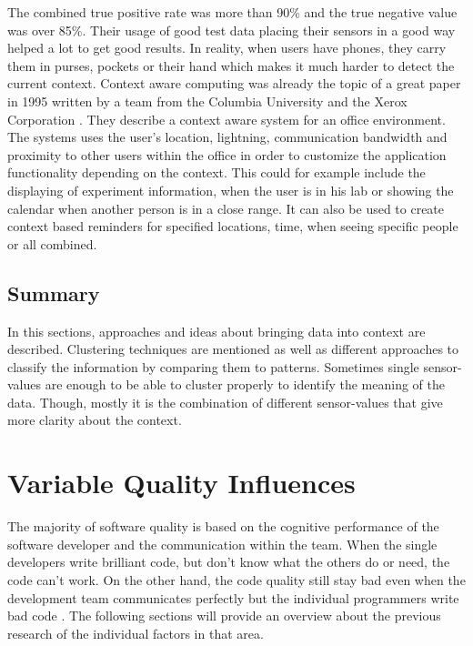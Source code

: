 The combined true positive rate was more than 90\% and the true negative value was over 85\%. Their usage of good test data placing their sensors in a good way helped a lot to get good results. In reality, when users have phones, they carry them in purses, pockets or their hand which makes it much harder to detect the current context.
Context aware computing was already the topic of a great paper in 1995 written by a team from the Columbia University and the Xerox Corporation \cite{schilit1994context}. They describe a context aware system for an office environment. The systems uses the user's location, lightning, communication bandwidth and proximity to other users within the office in order to customize the application functionality depending on the context. This could for example include the displaying of experiment information, when the user is in his lab or showing the calendar when another person is in a close range. It can also be used to create context based reminders for specified locations, time, when seeing specific people or all combined. 

\subsection{Summary} 
In this sections, approaches and ideas about bringing data into context are described. Clustering techniques are mentioned as well as different approaches to classify the information by comparing them to patterns. Sometimes single sensor-values are enough to be able to cluster properly to identify the meaning of the data. Though, mostly it is the combination of different sensor-values that give more clarity about the context.


\section{Variable Quality Influences}
The majority of software quality is based on the cognitive performance of the software developer and the communication within the team. 
When the single developers write brilliant code, but don't know what the others do or need, the code can't work. On the other hand, the code quality still stay bad even when the development team communicates perfectly but the individual programmers write bad code \cite{moe2010teamwork}. The following sections will provide an overview about the previous research of the individual factors in that area. 

